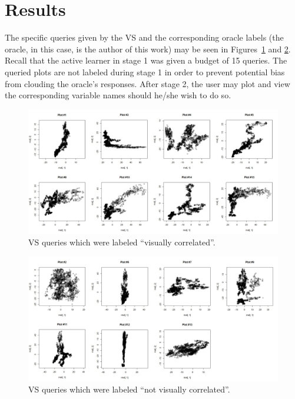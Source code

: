 \section{Results}
\label{sec:usage:results}

The specific queries given by the VS and the corresponding oracle labels 
(the oracle, in this case, is the author of this work) may be seen in 
Figures~\ref{fig:usage:interesting} and \ref{fig:usage:notinteresting}. Recall 
that the active learner in stage 1 was given a budget of 15 queries. The 
queried plots are not labeled during stage 1 in order to prevent potential bias 
from clouding the oracle's responses. After stage 2, the user may plot and view 
the corresponding variable names should he/she wish to do so.

\newpage 
\begin{figure}[htb]
	\begin{center}
		\includegraphics[width=1\linewidth]{ch-usage/figures/y_all}
		\caption[VS queries which were labeled ``visually correlated''.]{VS 
		queries which were labeled ``visually correlated''.}
		\label{fig:usage:interesting}
	\end{center}
\end{figure}

\begin{figure}[H]
	\begin{center}
		\includegraphics[width=1\linewidth]{ch-usage/figures/n_all}
		\caption[VS queries which were labeled ``not visually correlated''.]{VS 
		queries which were labeled ``not visually correlated''.}
		\label{fig:usage:notinteresting}
	\end{center}
\end{figure}

